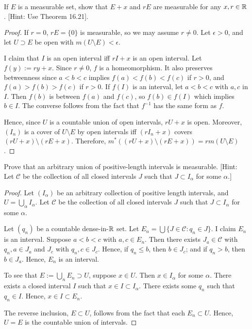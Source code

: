 \documentclass{article}
\begin{document}
 If $E$ is a measurable set, show that $E+x$ and $rE$ are measurable for any $x, r \in \mathbb{R}$. [Hint: Use Theorem 16.21].
\begin{proof}
If $r = 0$, $rE = \{0\}$ is measurable, so we may assume $r \ne 0$.
Let $\epsilon > 0$, and let $U \supset E$ be open with $m(U \setminus E) < \epsilon$. 

I claim that $I$ is an open interval iff $rI +x$ is an open interval. Let $f(y) := ry + x$. Since $r \ne 0$, $f$ is a homeomorphism. It also preserves betweenness since $a < b < c$ implies $f(a) < f(b) < f(c)$ if $r > 0$, and $f(a) > f(b) > f(c)$ if $r > 0$. If $f(I)$ is an interval, let $a<b<c$ with $a,c$ in $I$. Then $f(b)$ is between $f(a)$ and $f(c)$, so $f(b) \in f(I)$ which implies $b \in I$. The converse follows from the fact that $f^{-1}$ has the same form as $f$.

 Hence, since $U$ is a countable union of open intervals, $rU +x$ is open. Moreover, $(I_n)$ is a cover of $U \setminus E$ by open intervals iff $(rI_n + x)$ covers $(rU + x) \setminus (rE +x)$. Therefore, $m^*((rU+x) \setminus (rE+x)) = r m(U \setminus E)$.
\end{proof}
 Prove that an arbitrary union of positive-length intervals is measurable. [Hint: Let $\mathcal{C}$ be the collection of all closed intervals $J$ such that $J \subset I_\alpha$ for some $\alpha$.]
\begin{proof} Let $(I_\alpha)$ be an arbitrary collection of positive length intervals, and $U = \bigcup_\alpha I_\alpha$. Let $\mathcal{C}$ be the collection of all closed intervals $J$ such that $J \subset I_\alpha$ for some $\alpha$.

Let $(q_n)$ be a countable dense-in-$\mathbb{R}$ set. Let $E_n = \bigcup \{J \in \mathcal{C} : q_n \in J\}$. I claim $E_n$ is an interval. Suppose $a<b<c$ with $a,c \in E_n$. Then there exists $J_a \in \mathcal C$ with $q_n, a \in J_a$ and $J_c$ with $q_n, c \in J_c$. Hence, if $q_n \le b$, then $b \in J_c$; and if $q_n > b$, then $b \in J_a$. Hence, $E_n$ is an interval.

To see that $E := \bigcup_n E_n \supset U$, suppose $x \in U$. Then $x \in I_\alpha$ for some $\alpha$. There exists a closed interval $I$ such that $x \in I \subset I_\alpha$. There exists some $q_n$ such that $q_n \in I$. Hence, $x \in I \subset E_n$. 

The reverse inclusion, $E \subset U$, follows from the fact that each $E_n \subset U$. Hence, $U = E$ is the countable union of intervals.

\end{proof}
\end{document}
